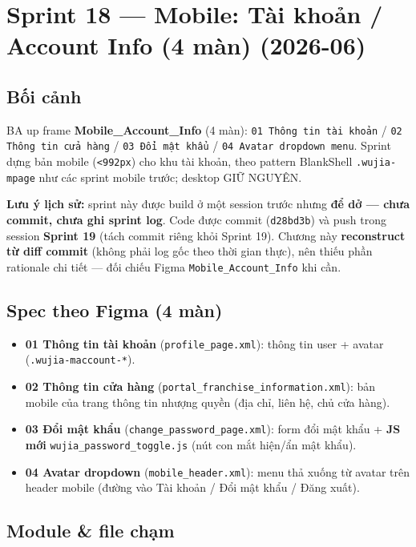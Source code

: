 \chapter{Sprint 18 --- Mobile: Tài khoản / Account Info (4 màn) (2026-06)}

\section{Bối cảnh}

BA up frame \textbf{Mobile\_Account\_Info} (4 màn): \texttt{01 Thông tin tài khoản} /
\texttt{02 Thông tin cửa hàng} / \texttt{03 Đổi mật khẩu} / \texttt{04 Avatar dropdown
menu}. Sprint dựng bản mobile (\texttt{<992px}) cho khu tài khoản, theo pattern BlankShell
\texttt{.wujia-mpage} như các sprint mobile trước; desktop GIỮ NGUYÊN.

\textbf{Lưu ý lịch sử:} sprint này được build ở một session trước nhưng \textbf{để dở --- chưa
commit, chưa ghi sprint log}. Code được commit (\texttt{d28bd3b}) và push trong session
\textbf{Sprint 19} (tách commit riêng khỏi Sprint 19). Chương này \textbf{reconstruct từ diff
commit} (không phải log gốc theo thời gian thực), nên thiếu phần rationale chi tiết --- đối
chiếu Figma \texttt{Mobile\_Account\_Info} khi cần.

\section{Spec theo Figma (4 màn)}

\begin{itemize}
  \item \textbf{01 Thông tin tài khoản} (\texttt{profile\_page.xml}): thông tin user +
        avatar (\texttt{.wujia-maccount-*}).
  \item \textbf{02 Thông tin cửa hàng} (\texttt{portal\_franchise\_information.xml}): bản
        mobile của trang thông tin nhượng quyền (địa chỉ, liên hệ, chủ cửa hàng).
  \item \textbf{03 Đổi mật khẩu} (\texttt{change\_password\_page.xml}): form đổi mật khẩu +
        \textbf{JS mới} \texttt{wujia\_password\_toggle.js} (nút con mắt hiện/ẩn mật khẩu).
  \item \textbf{04 Avatar dropdown} (\texttt{mobile\_header.xml}): menu thả xuống từ avatar
        trên header mobile (đường vào Tài khoản / Đổi mật khẩu / Đăng xuất).
\end{itemize}

\section{Module \& file chạm}

